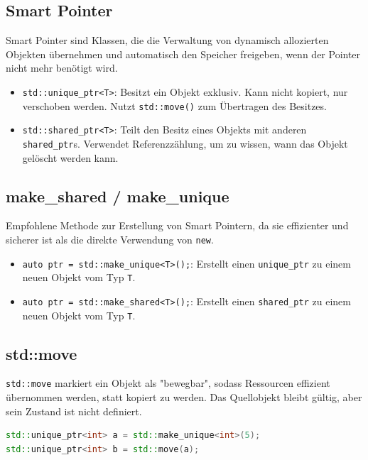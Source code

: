 \documentclass[10pt, a3paper, landscape]{article}
\begin{document}
\begin{multicols*}{4}
\section{Smart Pointer}

Smart Pointer sind Klassen, die die Verwaltung von dynamisch allozierten Objekten übernehmen und automatisch den Speicher freigeben, wenn der Pointer nicht mehr benötigt wird.

\begin{itemize}
    \item \lstinline|std::unique_ptr<T>|: Besitzt ein Objekt exklusiv. Kann nicht kopiert, nur verschoben werden. Nutzt \lstinline|std::move()| zum Übertragen des Besitzes.
    \item \lstinline|std::shared_ptr<T>|: Teilt den Besitz eines Objekts mit anderen \lstinline|shared_ptr|s. Verwendet Referenzzählung, um zu wissen, wann das Objekt gelöscht werden kann.
\end{itemize}

\newline\newline
\subsection*{make\_shared / make\_unique}

Empfohlene Methode zur Erstellung von Smart Pointern, da sie effizienter und sicherer ist als die direkte Verwendung von \lstinline|new|.

\begin{itemize}
    \item \lstinline|auto ptr = std::make_unique<T>();|: Erstellt einen \lstinline|unique_ptr| zu einem neuen Objekt vom Typ \lstinline|T|.
    \item \lstinline|auto ptr = std::make_shared<T>();|: Erstellt einen \lstinline|shared_ptr| zu einem neuen Objekt vom Typ \lstinline|T|.
\end{itemize}

\subsection*{std::move}

\lstinline|std::move| markiert ein Objekt als "bewegbar", sodass Ressourcen effizient übernommen werden, statt kopiert zu werden. Das Quellobjekt bleibt gültig, aber sein Zustand ist nicht definiert.
\begin{lstlisting}[language=C++]
std::unique_ptr<int> a = std::make_unique<int>(5);
std::unique_ptr<int> b = std::move(a); 
\end{lstlisting}










\end{multicols*}
\end{document}
